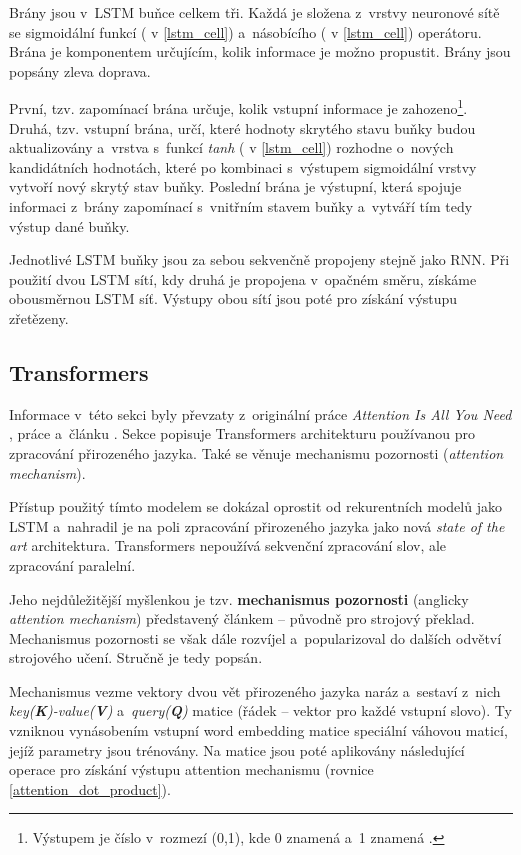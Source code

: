 Brány jsou v~LSTM buňce celkem tři. Každá je složena z~vrstvy neuronové sítě se sigmoidální funkcí ( v \ref{lstm_cell}) a~násobícího (\uv{$\times$} v \ref{lstm_cell}) operátoru. Brána je komponentem určujícím, kolik informace je možno propustit. Brány jsou popsány zleva doprava.\par
První, tzv. zapomínací brána určuje, kolik vstupní informace je zahozeno\footnote{Výstupem je číslo v~rozmezí (0,1), kde 0 znamená  a~1 znamená .}. Druhá, tzv. vstupní brána, určí, které hodnoty skrytého stavu buňky budou aktualizovány a~vrstva s~funkcí \emph{tanh} ( v \ref{lstm_cell}) rozhodne o~nových kandidátních hodnotách, které po kombinaci s~výstupem sigmoidální vrstvy vytvoří nový skrytý stav buňky. Poslední brána je výstupní, která spojuje informaci z~brány zapomínací s~vnitřním stavem buňky a~vytváří tím tedy výstup dané buňky.\par
Jednotlivé LSTM buňky jsou za sebou sekvenčně propojeny stejně jako RNN. Při použití dvou LSTM sítí, kdy druhá je propojena v~opačném směru, získáme obousměrnou LSTM síť. Výstupy obou sítí jsou poté pro získání výstupu zřetězeny.

\subsection{Transformers}
\label{transformers}
Informace v~této sekci byly převzaty z~originální práce \emph{Attention Is All You Need} \cite{Transformers}, práce \cite{attention_mechanism} a~článku \cite{Transformers-explained}. Sekce popisuje Transformers architekturu používanou pro zpracování přirozeného jazyka. Také se věnuje mechanismu pozornosti (\emph{attention mechanism}).\par
Přístup použitý tímto modelem se dokázal oprostit od rekurentních modelů jako LSTM a~nahradil je na poli zpracování přirozeného jazyka jako nová \textit{state of the art} architektura. Transformers nepoužívá sekvenční zpracování slov, ale zpracování paralelní.\par
Jeho nejdůležitější myšlenkou je tzv. \textbf{mechanismus pozornosti} (anglicky \emph{attention mechanism}) představený článkem \cite{attention_mechanism} -- původně pro strojový překlad. Mechanismus pozornosti se však dále rozvíjel a~popularizoval do dalších odvětví strojového učení. Stručně je tedy popsán.\par \medskip

Mechanismus vezme vektory dvou vět přirozeného jazyka naráz a~sestaví z~nich \emph{key(\textbf{K})-value(\textbf{V})} a~\emph{query(\textbf{Q})} matice (řádek -- vektor pro každé vstupní slovo). Ty vzniknou vynásobením vstupní word embedding matice speciální váhovou maticí, jejíž parametry jsou trénovány. Na matice jsou poté aplikovány následující operace pro získání výstupu attention mechanismu (rovnice \ref{attention_dot_product}).

